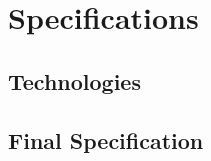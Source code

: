 \section{Specifications}
	

	

	
\subsection{Technologies}
	
	
	


\subsection{Final Specification}
			

		



		

		



